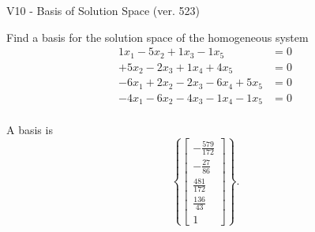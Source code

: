 \begin{exercise}
  \begin{exerciseTitle}V10 - Basis of Solution Space (ver. 523)\end{exerciseTitle}
  \begin{exerciseStatement}
    Find a basis for the solution space of the homogeneous system 
\begin{align*}
 1 x_ 1 -5 x_ 2 + 1 x_ 3 -1 x_ 5 &= 0  \\ 
  + 5 x_ 2 -2 x_ 3 + 1 x_ 4 + 4 x_ 5 &= 0  \\ 
  -6 x_ 1 + 2 x_ 2 -2 x_ 3 -6 x_ 4 + 5 x_ 5 &= 0  \\ 
  -4 x_ 1 -6 x_ 2 -4 x_ 3 -1 x_ 4 -1 x_ 5 &= 0  \\ 
 \end{align*}


 
  \end{exerciseStatement}

  \begin{exerciseAnswer}
   A basis is   
\[\left\{\left[\begin{array}{c}
-\frac{579}{172} \\
-\frac{27}{86} \\
\frac{481}{172} \\
\frac{136}{43} \\
1
\end{array}\right]\right\}.\]

  


  \end{exerciseAnswer}
\end{exercise}